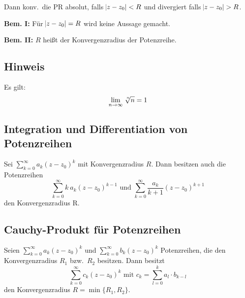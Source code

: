 \documentclass[10pt]{article}
\newcommand*{\nthSqrt}[2]{\sqrt[\leftroot{-2}\uproot{2}#1]{#2}}
\begin{document}
    Dann konv.\ die PR absolut, falls $\abs{z - z_0} < R$ und divergiert falls
    $\abs{z - z_0} > R$.

    \textbf{Bem. I:} Für $\abs{z - z_0} = R$ wird keine Aussage gemacht.

    \textbf{Bem. II:} $R$ heißt der Konvergenzradius der Potenzreihe.

    \subsection{Hinweis}
    Es gilt:
    \begin{equation*}
        \lim_{n \rightarrow \infty} \nthSqrt{n}{n} = 1
    \end{equation*}

    \subsection{Integration und Differentiation von Potenzreihen}
    Sei $\sum_{k=0}^\infty a_k {(z - z_0)}^k$ mit Konvergenzradius $R$. Dann besitzen
    auch die Potenzreihen
    \begin{equation*}
        \sum_{k=0}^\infty k\: a_k {(z - z_0)}^{k-1} \text{ und }
        \sum_{k=0}^\infty \frac{a_k}{k+1} {(z-z_0)}^{k+1}
    \end{equation*}
    den Konvergenzradius R.

    \subsection{Cauchy-Produkt für Potenzreihen}
    Seien $\sum_{k=0}^\infty a_k {(z-z_0)}^k$ und
    $\sum_{k=0}^\infty b_k {(z-z_0)}^k$ Potenzreihen, die den Konvergenzradius
    $R_1$ bzw.\ $R_2$ besitzen. Dann besitzt
    \begin{equation*}
            \sum_{k=0}^\infty c_k {(z-z_0)}^k \text{ mit }
            c_k = \sum_{l=0}^k a_l \cdot b_{k-l}
    \end{equation*}
    den Konvergenzradius $R = \min \{R_1, R_2\}$.
\end{document}
